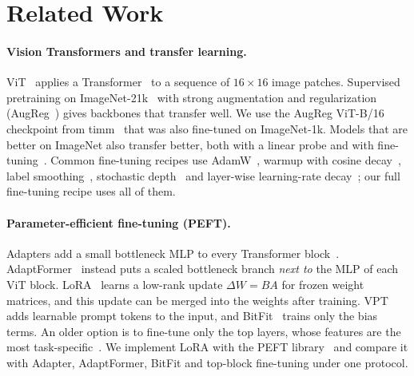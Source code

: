 \section{Related Work}
\label{sec:related}

\paragraph{Vision Transformers and transfer learning.}
ViT~\cite{dosovitskiy2021vit} applies a Transformer~\cite{vaswani2017attention} to a sequence of $16 \times 16$ image patches.
Supervised pretraining on ImageNet-21k~\cite{deng2009imagenet} with strong augmentation and regularization (AugReg~\cite{steiner2022augreg}) gives backbones that transfer well.
We use the AugReg ViT-B/16 checkpoint from timm~\cite{wightman2019timm} that was also fine-tuned on ImageNet-1k.
Models that are better on ImageNet also transfer better, both with a linear probe and with fine-tuning~\cite{kornblith2019better}.
Common fine-tuning recipes use AdamW~\cite{loshchilov2019adamw}, warmup with cosine decay~\cite{loshchilov2017sgdr}, label smoothing~\cite{szegedy2016rethinking}, stochastic depth~\cite{huang2016stochastic} and layer-wise learning-rate decay~\cite{bao2022beit}; our full fine-tuning recipe uses all of them.

\paragraph{Parameter-efficient fine-tuning (PEFT).}
Adapters add a small bottleneck MLP to every Transformer block~\cite{houlsby2019adapter}.
AdaptFormer~\cite{chen2022adaptformer} instead puts a scaled bottleneck branch \emph{next to} the MLP of each ViT block.
LoRA~\cite{hu2022lora} learns a low-rank update $\Delta W = BA$ for frozen weight matrices, and this update can be merged into the weights after training.
VPT~\cite{jia2022vpt} adds learnable prompt tokens to the input, and BitFit~\cite{benzaken2022bitfit} trains only the bias terms.
An older option is to fine-tune only the top layers, whose features are the most task-specific~\cite{yosinski2014transferable}.
We implement LoRA with the PEFT library~\cite{mangrulkar2022peft} and compare it with Adapter, AdaptFormer, BitFit and top-block fine-tuning under one protocol.

